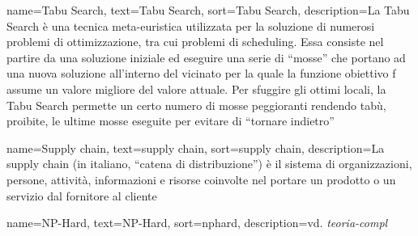 {
    name=Tabu Search,
    text=Tabu Search,
    sort=Tabu Search,
    description={La Tabu Search è una tecnica meta-euristica utilizzata per la soluzione di numerosi problemi di ottimizzazione, tra cui problemi di scheduling. Essa consiste nel partire da una soluzione iniziale ed eseguire una serie di ``mosse'' che portano ad una nuova soluzione all'interno del vicinato per la quale la funzione obiettivo f assume un valore migliore del valore attuale. Per sfuggire gli ottimi locali, la Tabu Search permette un certo numero di mosse peggioranti rendendo tabù, proibite, le ultime mosse eseguite per evitare di ``tornare indietro''}
}

{
    name=Supply chain,
    text=supply chain,
    sort=supply chain,
    description={La supply chain (in italiano, ``catena di distribuzione'') è il sistema di organizzazioni, persone, attività, informazioni e risorse coinvolte nel portare un prodotto o un servizio dal fornitore al cliente}
}

{
    name=NP-Hard,
    text=NP-Hard,
    sort=nphard,
    description={vd. \emph{\gls{teoria-compl}}\glsfirstoccur}
}

